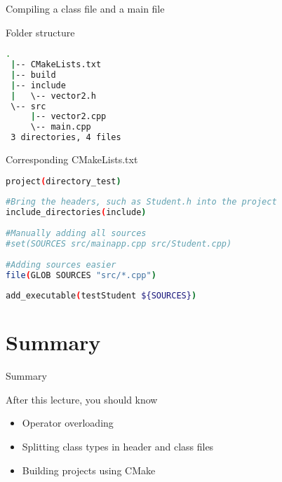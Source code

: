 \documentclass[12pt,t]{beamer}
\begin{document}
\begin{frame}[fragile]{Compiling a class file and a main file}

\begin{block}{Folder structure}
\begin{lstlisting}[language=bash]
 .
 |-- CMakeLists.txt
 |-- build
 |-- include
 |   \-- vector2.h
 \-- src
     |-- vector2.cpp
     \-- main.cpp
 3 directories, 4 files
\end{lstlisting}
\end{block}

\end{frame}


\begin{frame}[fragile]{Corresponding CMakeLists.txt}
\begin{lstlisting}[language=bash]
project(directory_test)
 
#Bring the headers, such as Student.h into the project
include_directories(include)
 
#Manually adding all sources 
#set(SOURCES src/mainapp.cpp src/Student.cpp)
 
#Adding sources easier
file(GLOB SOURCES "src/*.cpp")
 
add_executable(testStudent ${SOURCES})
\end{lstlisting}
\end{frame}

\section{Summary}

\begin{frame}{Summary}
\begin{block}{After this lecture, you should know}
\begin{itemize}
\item Operator overloading
\item Splitting class types in header and class files
\item Building projects using CMake
\end{itemize}
\end{block}
\end{frame}
\end{document}
